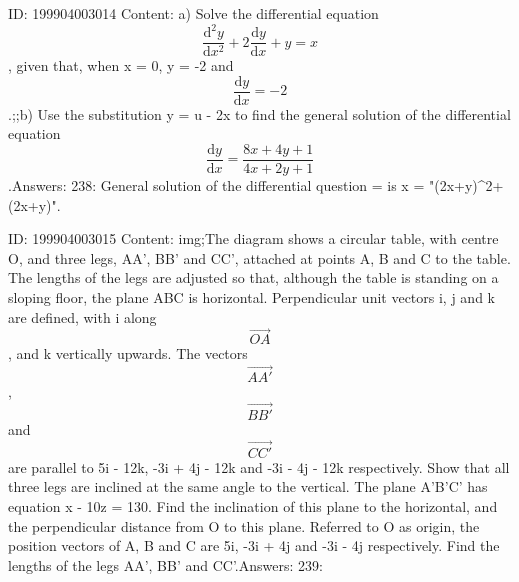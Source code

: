 \documentclass{article}
\begin{document}
ID: 199904003014
Content:
a) Solve the differential equation \[\frac{\mathrm{d}^2 y}{\mathrm{d} x^2} + 2\frac{\mathrm{d} y}{\mathrm{d} x} + y = x\], given that, when x = 0, y = -2 and \[\frac{\mathrm{d} y}{\mathrm{d} x} = -2\].;;b) Use the substitution y = u - 2x to find the general solution of the differential equation \[\frac{\mathrm{d} y}{\mathrm{d} x} = \frac {8x + 4y + 1}{4x + 2y + 1}\].Answers:
238: General solution of the differential question  =  is x = "(2x+y)^2+(2x+y)".

ID: 199904003015
Content:
img;The diagram shows a circular table, with centre O, and three legs, AA', BB' and CC', attached at points A, B and C to the table. The lengths of the legs are adjusted so that, although the table is standing on a sloping floor, the plane ABC is horizontal. Perpendicular unit vectors i, j and k are defined, with i along \[\overrightarrow{OA}\], and k vertically upwards. The vectors \[\overrightarrow{AA'}\], \[\overrightarrow{BB'}\] and \[\overrightarrow{CC'}\] are parallel to 5i - 12k, -3i + 4j - 12k and -3i - 4j - 12k respectively. Show that all three legs are inclined at the same angle to the vertical. The plane A'B'C' has equation x - 10z = 130. Find the inclination of this plane to the horizontal, and the perpendicular distance from O to this plane. Referred to O as origin, the position vectors of A, B and C are 5i, -3i + 4j and -3i - 4j respectively. Find the lengths of the legs AA', BB' and CC'.Answers:
239: 
\end{document}
